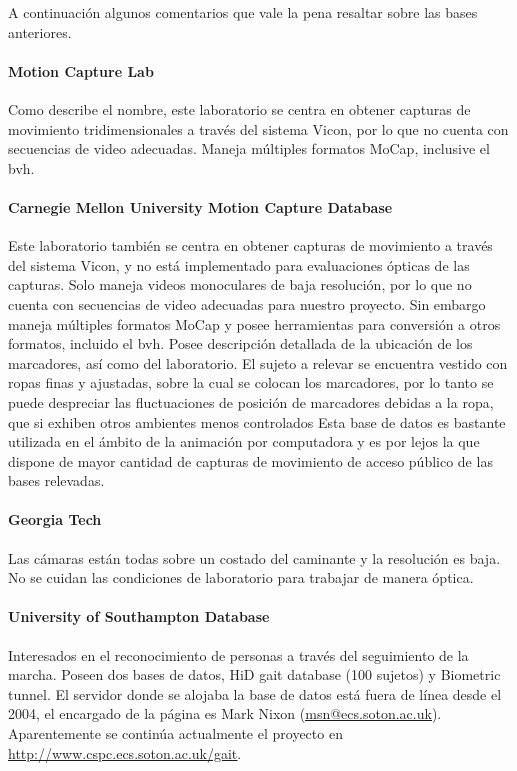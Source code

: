 \begin{table}[h!]
\begin{minipage}{\textwidth}
\begin{tabular}{||l|ccccc||}
	\end{tabular}
	\end{minipage}
	
\end{table}

A continuación algunos comentarios que vale la pena resaltar sobre  las bases anteriores.


\paragraph{Motion Capture Lab}
	Como describe el nombre, este laboratorio se centra en obtener capturas de movimiento tridimensionales a través del sistema Vicon, por lo que no cuenta con secuencias de video adecuadas. Maneja múltiples formatos MoCap, inclusive el bvh.



\paragraph{Carnegie Mellon University Motion Capture Database}
 Este laboratorio también se centra en obtener capturas de movimiento a través del sistema Vicon, y no está implementado para evaluaciones ópticas de las capturas. Solo maneja videos monoculares de baja resolución, por lo que no cuenta con secuencias de video adecuadas para nuestro proyecto. Sin embargo maneja múltiples formatos MoCap y  posee herramientas para conversión a otros formatos, incluido el bvh. Posee descripción detallada de la ubicación de los marcadores, así como del laboratorio. El sujeto a relevar se encuentra vestido con ropas finas y ajustadas, sobre la cual se colocan los marcadores, por lo tanto se puede despreciar las fluctuaciones de posición de marcadores debidas a la ropa, que si exhiben otros ambientes menos controlados  Esta base de datos es bastante utilizada en el ámbito de la  animación por computadora y es por lejos la que dispone de mayor cantidad de capturas de movimiento de acceso público de las bases relevadas.

\paragraph{Georgia Tech}
Las cámaras están todas sobre un costado del caminante y la resolución es baja. No se cuidan las condiciones de laboratorio para trabajar de manera óptica.


\paragraph{University of Southampton Database}
Interesados en el reconocimiento de personas a través del seguimiento de la marcha. Poseen dos bases de datos, HiD gait database  (100 sujetos) y Biometric tunnel. El servidor donde se alojaba la base de datos está fuera de línea desde el 2004, el encargado de la página es Mark Nixon (\textcolor{blue}{\underline{\url{msn@ecs.soton.ac.uk}}}). Aparentemente se continúa actualmente el proyecto en \textcolor{blue}{\underline{\url{http://www.cspc.ecs.soton.ac.uk/gait}}}.  

